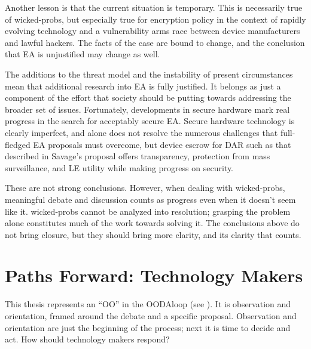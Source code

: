 Another lesson is that the current situation is temporary. This is necessarily true of \acp{wicked-prob}, but especially
true for encryption policy in the context of rapidly evolving technology and a vulnerability arms race between device
manufacturers and lawful hackers. The facts of the case are bound to change, and the conclusion that \ac{EA} is
unjustified may change as well.


The additions to the threat model and the instability of present circumstances mean that additional research into
\ac{EA} is fully justified. It belongs as just a component of the effort that society should be putting towards
addressing the broader set of issues. Fortunately, developments in secure hardware mark real progress in the search for
acceptably secure \ac{EA}. Secure hardware technology is clearly imperfect, and alone does not resolve the numerous
challenges that full-fledged \ac{EA} proposals must overcome, but device escrow for \acl{DAR} such as that described in
Savage's proposal offers transparency, protection from mass surveillance, and \acl{LE} utility while making progress on
security.

These are not strong conclusions. However, when dealing with \acp{wicked-prob}, meaningful debate and discussion counts
as progress even when it doesn't seem like it. \Acp{wicked-prob} cannot be analyzed into resolution; grasping the
problem alone constitutes much of the work towards solving it. The conclusions above do not bring closure, but they
should bring more clarity, and its clarity that counts.


\section{Paths Forward: Technology Makers}

This thesis represents an ``OO'' in the \ac{OODAloop} (see ). It is observation and
orientation, framed around the debate and a specific proposal. Observation and orientation are just the beginning of the
process; next it is time to decide and act. How should technology makers respond?

